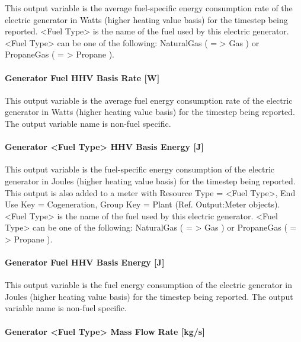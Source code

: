 This output variable is the average fuel-specific energy consumption rate of the electric generator in Watts (higher heating value basis) for the timestep being reported. \textless{}Fuel Type\textgreater{} is the name of the fuel used by this electric generator. \textless{}Fuel Type\textgreater{} can be one of the following: NaturalGas ( = \textgreater{} Gas ) or PropaneGas ( = \textgreater{} Propane ).

\paragraph{Generator Fuel HHV Basis Rate {[}W{]}}\label{generator-fuel-hhv-basis-rate-w-1}

This output variable is the average fuel energy consumption rate of the electric generator in Watts (higher heating value basis) for the timestep being reported. The output variable name is non-fuel specific.

\paragraph{Generator \textless{}Fuel Type\textgreater{} HHV Basis Energy {[}J{]}}\label{generator-fuel-type-hhv-basis-energy-j}

This output variable is the fuel-specific energy consumption of the electric generator in Joules (higher heating value basis) for the timestep being reported. This output is also added to a meter with Resource Type = \textless{}Fuel Type\textgreater{}, End Use Key = Cogeneration, Group Key = Plant (Ref. Output:Meter objects). \textless{}Fuel Type\textgreater{} is the name of the fuel used by this electric generator. \textless{}Fuel Type\textgreater{} can be one of the following: NaturalGas ( = \textgreater{} Gas ) or PropaneGas ( = \textgreater{} Propane ).

\paragraph{Generator Fuel HHV Basis Energy {[}J{]}}\label{generator-fuel-hhv-basis-energy-j-1}

This output variable is the fuel energy consumption of the electric generator in Joules (higher heating value basis) for the timestep being reported. The output variable name is non-fuel specific.

\paragraph{Generator \textless{}Fuel Type\textgreater{} Mass Flow Rate {[}kg/s{]}}\label{generator-fuel-type-mass-flow-rate-kgs-2}

